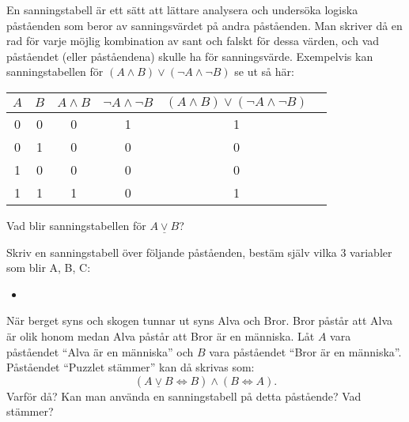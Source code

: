 \begin{definition}[Sanningstabell] %
	En sanningstabell är ett sätt att lättare analysera och undersöka logiska påståenden som beror av sanningsvärdet på andra påståenden. Man skriver då en rad för varje möjlig kombination av sant och falskt för dessa värden, och vad påståendet (eller påståendena) skulle ha för sanningsvärde. Exempelvis kan sanningstabellen för \((A \land B) \lor (\lnot A \land \lnot B)\) se ut så här:
	\begin{center}
		\begin{tabular}{|c|c|c|c|c|c|}
			\hline
			\(A\) & \(B\)  & \(A \land B\)  & \(\lnot A \land \lnot B\) & \((A \land B) \lor (\lnot A \land \lnot B)\)\\ \hline
			0 & 0 & 0 & 1 & 1 \\ \hline
			0 & 1 & 0 & 0 & 0 \\ \hline
			1 & 0 & 0 & 0 & 0 \\ \hline
			1 & 1 & 1 & 0 & 1 \\ \hline
		\end{tabular}
	\end{center}
\end{definition}


\begin{problem}
	Vad blir sanningstabellen för \(A \underline{\lor} B\)?
\end{problem}

\begin{problem}
	Skriv en sanningstabell över följande påståenden, bestäm själv vilka 3 variabler som blir A, B, C:
	\begin{itemize}
		\item 
	\end{itemize}
	
\end{problem}

\begin{problem}
	När berget syns och skogen tunnar ut syns Alva och Bror. Bror påstår att Alva är olik honom medan Alva påstår att Bror är en människa. Låt \(A\) vara påståendet ``Alva är en människa'' och \(B\) vara påståendet ``Bror är en människa''. Påståendet ``Puzzlet stämmer'' kan då skrivas som:
	\[
		(A \underline{\lor} B \Leftrightarrow  B) \land (B \Leftrightarrow A).
	\]
	Varför då? Kan man använda en sanningstabell på detta påstående? Vad stämmer?
\end{problem}


